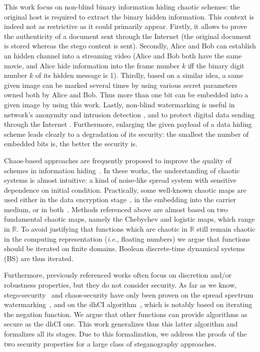 \documentclass{comjnl}
\begin{document}
This work focus on non-blind  binary information hiding chaotic schemes: 
the  original host  is  required  to  extract the  binary hidden
information. This  context is indeed not
as restrictive as it could primarily appear.
Firstly, it allows to prove 
the authenticity of a document sent  through the  Internet 
(the original document is stored whereas the stego content is sent). 
Secondly, Alice and Bob can establish an hidden channel into a
streaming video 
(Alice and Bob both have the same movie, and  Alice hide information into 
the frame number $k$  iff the binary digit
number $k$ of its hidden message is  1).
Thirdly, based on a similar idea, a same
given image can be marked  several times by using various secret parameters
owned both by Alice and Bob. Thus more than one bit can be embedded into a given
image  by using  this work. Lastly,  non-blind watermarking  is
useful in  network's anonymity and intrusion  detection \cite{Houmansadr09}, and
to protect digital data sending through the Internet \cite{P1150442004}.
Furthermore,  enlarging the given payload  of a data  hiding scheme leads
clearly to  a degradation of its  security: the smallest the  number of embedded
bits is, the better the security is.


Chaos-based approaches are frequently proposed to improve
the quality of schemes in information 
hiding~\cite{Wu2007,Liu07,CongJQZ06,Zhu06}.
In these works, the understanding of chaotic systems
is almost intuitive: a kind of noise-like spread system
with sensitive dependence on initial condition.
Practically, some well-known chaotic maps are used
either in the data encryption stage~\cite{Liu07,CongJQZ06}, 
in the embedding into the carrier medium,
or in both~\cite{Wu2007,Wu2007bis}.
Methods referenced above are almost based on two
fundamental chaotic maps, namely the Chebychev and logistic maps, which range in $\mathbb{R}$. 
To avoid justifying that functions which are chaotic in $\mathbb{R}$
still remain chaotic in the computing representation (\textit{i.e.},
floating numbers) we argue that functions should be iterated on finite domains.
Boolean discrete-time dynamical systems (BS) are thus iterated.

Furthermore, previously referenced works often focus on  
discretion and/or robustness properties, but they do not consider security.  
As far as we know, stego-security~\cite{Cayre2008} and chaos-security 
have only been proven 
on the spread spectrum watermarking~\cite{Cox97securespread},
and on
the dhCI algorithm~\cite{gfb10:ip}, which is notably based on iterating  
the negation function.
We argue that other functions can provide algorithms as secure as the dhCI one.
This work generalizes thus this latter algorithm and formalizes all
its stages. Due to this formalization, we address the proofs of the two
security properties for a large class of steganography approaches.  
\end{document}
